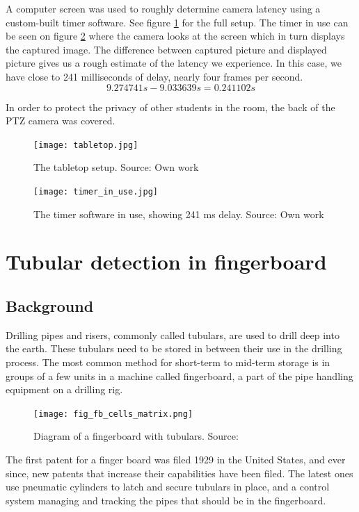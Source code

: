 A computer screen was used to roughly determine camera latency using a custom-built timer software. See figure \ref{fig:tabletop} for the full setup. The timer in use can be seen on figure \ref{fig:timer_in_use} where the camera looks at the screen which in turn displays the captured image. The difference between captured picture and displayed picture gives us a rough estimate of the latency we experience. In this case, we have close to 241 milliseconds of delay, nearly four frames per second.
\begin{equation}
9.274741s - 9.033639s = 0.241102s
\end{equation}

In order to protect the privacy of other students in the room, the back of the PTZ camera was covered.

\begin{figure}[ht]
    \centering
    \texttt{[image: tabletop.jpg]}
    \caption{The tabletop setup. Source: Own work}
    \label{fig:tabletop}
\end{figure}

\begin{figure}[ht]
    \centering
    \texttt{[image: timer\_in\_use.jpg]}
    \caption{The timer software in use, showing 241 ms delay. Source: Own work}
    \label{fig:timer_in_use}
\end{figure}


\section{Tubular detection in fingerboard}
\subsection{Background}
Drilling pipes and risers, commonly called tubulars, are used to drill deep into the earth. These tubulars need to be stored in between their use in the drilling process. The most common method for short-term to mid-term storage is in groups of a few units in a machine called fingerboard, a part of the pipe handling equipment on a drilling rig.

\begin{figure}[ht]
    \centering
    \texttt{[image: fig\_fb\_cells\_matrix.png]}
    \caption{Diagram of a fingerboard with tubulars. Source:\cite{fig_fb_cells_matrix13}}
    \label{fig:fb_cells_matrix}
\end{figure}
\FloatBarrier

The first patent for a finger board was filed 1929 in the United States, and ever since, new patents that increase their capabilities have been filed. The latest ones use pneumatic cylinders to latch and secure tubulars in place, and a control system managing and tracking the pipes that should be in the fingerboard.

